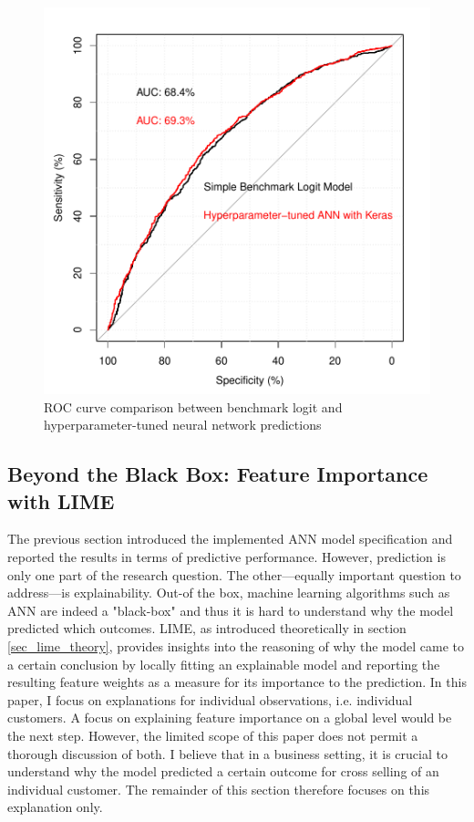 \documentclass[12pt,a4paper]{article}
\begin{document}
\begin{figure}[ht]
	\centering
  \includegraphics[scale=0.63]{figures/roc_auc_comp.pdf}
	\caption{ROC curve comparison between benchmark logit and hyperparameter-tuned neural network predictions}
	\label{fig_roc}
\end{figure}


\subsection{Beyond the Black Box: Feature Importance with LIME}
The previous section introduced the implemented ANN model specification and reported the results in terms of predictive performance.
However, prediction is only one part of the research question.
The other---equally important question to address---is explainability.
Out-of the box, machine learning algorithms such as ANN are indeed a "black-box" and thus it is hard to understand why the model predicted which outcomes.
LIME, as introduced theoretically in section \ref{sec_lime_theory}, provides insights into the reasoning of why the model came to a certain
conclusion by locally fitting an explainable model and reporting the resulting feature weights as a measure for its importance to the prediction.
In this paper, I focus on explanations for individual observations, i.e. individual customers.
A focus on explaining feature importance on a global level would be the next step.
However, the limited scope of this paper does not permit a thorough discussion of both.
I believe that in a business setting, it is crucial to understand why the model predicted a certain outcome for cross selling of an individual customer.
The remainder of this section therefore focuses on this explanation only.
\end{document}
